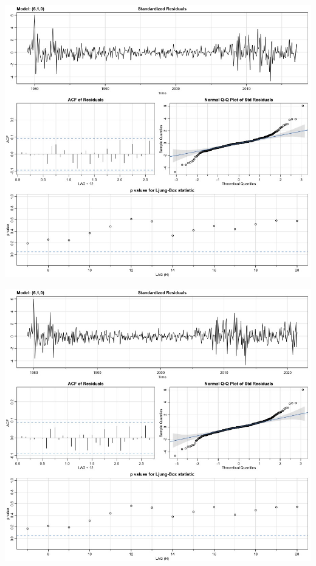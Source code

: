 \documentclass[paper=letter, fontsize=11pt]{scrartcl}
\begin{document}
\begin{minipage}{\textwidth}
  \begin{minipage}[b]{0.49\textwidth}
    \centering
    \includegraphics[width=\linewidth]{Image/bj610.jpeg}
    \label{fig:arima610}
  \end{minipage}
  \hfill
  \begin{minipage}[b]{0.49\textwidth}
    \centering
    \centering
    \includegraphics[width=\linewidth]{Image/fianl-arima.jpeg}
    \label{fig:arima_res}
  \end{minipage}
\end{minipage}
\end{document}
